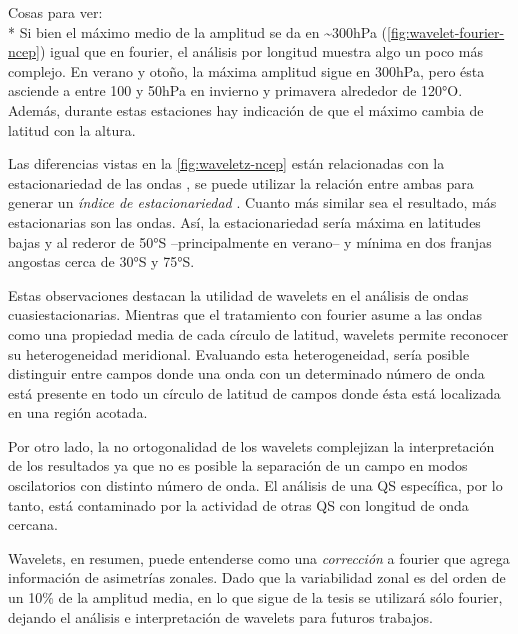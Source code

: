 \documentclass[spanish,a4paper]{book}
\begin{document}
Cosas para ver:\\
* Si bien el máximo medio de la amplitud se da en
\textasciitilde{}300hPa (\autoref{fig:wavelet-fourier-ncep}) igual que
en fourier, el análisis por longitud muestra algo un poco más complejo.
En verano y otoño, la máxima amplitud sigue en 300hPa, pero ésta
asciende a entre 100 y 50hPa en invierno y primavera alrededor de 120°O.
Además, durante estas estaciones hay indicación de que el máximo cambia
de latitud con la altura.

Las diferencias vistas en la \autoref{fig:waveletz-ncep} están
relacionadas con la estacionariedad de las ondas
,
se puede utilizar la relación entre ambas para generar un \emph{índice
de estacionariedad} . Cuanto más
similar sea el resultado, más estacionarias son las ondas. Así, la
estacionariedad sería máxima en latitudes bajas y al rederor de 50°S
--principalmente en verano-- y mínima en dos franjas angostas cerca de
30°S y 75°S. 

Estas observaciones destacan la utilidad de wavelets en el análisis de
ondas cuasiestacionarias. Mientras que el tratamiento con fourier asume
a las ondas como una propiedad media de cada círculo de latitud,
wavelets permite reconocer su heterogeneidad meridional. Evaluando esta
heterogeneidad, sería posible distinguir entre campos donde una onda con
un determinado número de onda está presente en todo un círculo de
latitud de campos donde ésta está localizada en una región acotada.

Por otro lado, la no ortogonalidad de los wavelets complejizan la
interpretación de los resultados ya que no es posible la separación de
un campo en modos oscilatorios con distinto número de onda. El análisis
de una QS específica, por lo tanto, está contaminado por la actividad de
otras QS con longitud de onda cercana.

Wavelets, en resumen, puede entenderse como una \emph{corrección} a
fourier que agrega información de asimetrías zonales. Dado que la
variabilidad zonal es del orden de un 10\% de la amplitud media, en lo
que sigue de la tesis se utilizará sólo fourier, dejando el análisis e
interpretación de wavelets para futuros trabajos.
\end{document}
